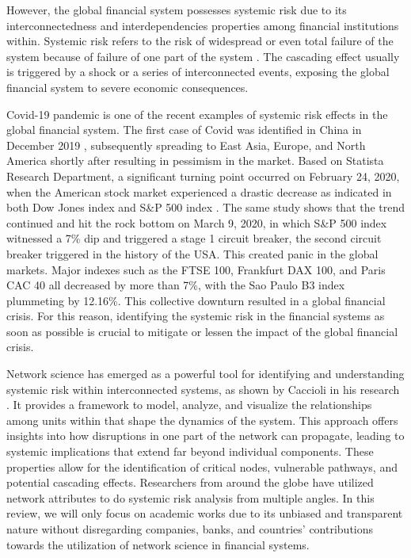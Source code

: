 \documentclass[a4paper,11pt]{article}
\begin{document}
However, the global financial system possesses systemic risk due to its interconnectedness and interdependencies properties among financial institutions within. Systemic risk refers to the risk of widespread or even total failure of the system because of failure of one part of the system \cite{SystemicRisk}. The cascading effect usually is triggered by a shock or a series of interconnected events, exposing the global financial system to severe economic consequences.

Covid-19 pandemic is one of the recent examples of systemic risk effects in the global financial system. The first case of Covid was identified in China in December 2019 \cite{WHOTimeline}, subsequently spreading to East Asia, Europe, and North America shortly after resulting in pessimism in the market. Based on Statista Research Department, a significant turning point occurred on February 24, 2020, when the American stock market experienced a drastic decrease as indicated in both Dow Jones index and S\&P 500 index \cite{IndexDuringCovid}. The same study shows that the trend continued and hit the rock bottom on March 9, 2020, in which S\&P 500 index witnessed a 7\% dip and triggered a stage 1 circuit breaker, the second circuit breaker triggered in the history of the USA. This created panic in the global markets. Major indexes such as the FTSE 100, Frankfurt DAX 100, and Paris CAC 40 all decreased by more than 7\%, with the Sao Paulo B3 index plummeting by 12.16\%. This collective downturn resulted in a global financial crisis. For this reason, identifying the systemic risk in the financial systems as soon as possible is crucial to mitigate or lessen the impact of the global financial crisis.

Network science has emerged as a powerful tool for identifying and understanding systemic risk within interconnected systems, as shown by Caccioli in his research \cite{Caccioli2018}. It provides a framework to model, analyze, and visualize the relationships among units within that shape the dynamics of the system. This approach offers insights into how disruptions in one part of the network can propagate, leading to systemic implications that extend far beyond individual components. These properties allow for the identification of critical nodes, vulnerable pathways, and potential cascading effects. Researchers from around the globe have utilized network attributes to do systemic risk analysis from multiple angles. In this review, we will only focus on academic works due to its unbiased and transparent nature without disregarding companies, banks, and countries' contributions towards the utilization of network science in financial systems.
\end{document}
